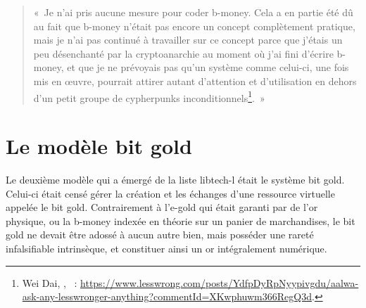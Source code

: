 \begin{quote}
«~Je n'ai pris aucune mesure pour coder b-money. Cela a en partie été dû au fait que b-money n'était pas encore un concept complètement pratique, mais je n'ai pas continué à travailler sur ce concept parce que j'étais un peu désenchanté par la cryptoanarchie au moment où j'ai fini d'écrire b-money, et que je ne prévoyais pas qu'un système comme celui-ci, une fois mis en œuvre, pourrait attirer autant d'attention et d'utilisation en dehors d'un petit groupe de cypherpunks inconditionnels\footnote{Wei Dai, , ~: \url{https://www.lesswrong.com/posts/YdfpDyRpNyypivgdu/aalwa-ask-any-lesswronger-anything?commentId=XKwphuwm366RegQ3d}.}.~»
\end{quote}


\section*{Le modèle bit gold} %

Le deuxième modèle qui a émergé de la liste libtech-l était le système bit gold. Celui-ci était censé gérer la création et les échanges d'une ressource virtuelle appelée le bit gold. Contrairement à l'e-gold qui était garanti par de l'or physique, ou la b-money indexée en théorie sur un panier de marchandises, le bit gold ne devait être adossé à aucun autre bien, mais posséder une rareté infalsifiable intrinsèque, et constituer ainsi un or intégralement numérique. %

